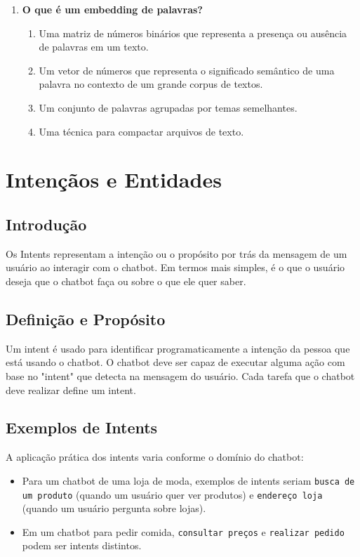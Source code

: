 \documentclass[14pt,a4paper,oneside]{book}
\begin{document}
\begin{enumerate}
\item \textbf{O que é um embedding de palavras?} 
\begin{enumerate}[label=\alph*)]
\item Uma matriz de números binários que representa a presença ou ausência de palavras em um texto. 
\item Um vetor de números que representa o significado semântico de uma palavra no contexto de um grande corpus de textos. 
\item Um conjunto de palavras agrupadas por temas semelhantes. 
\item Uma técnica para compactar arquivos de texto. 
\end{enumerate}

\end{enumerate}


\chapter{Intençãos e Entidades}
\label{chap:intents}

\section{Introdução}

Os Intents representam a intenção ou o propósito por trás da mensagem de um usuário ao interagir com o chatbot. Em termos mais simples, é o que o usuário deseja que o chatbot faça ou sobre o que ele quer saber.

\section{Definição e Propósito}
\label{sec:intents_definicao}

Um intent é usado para identificar programaticamente a intenção da pessoa que está usando o chatbot. O chatbot deve ser capaz de executar alguma ação com base no "intent" que detecta na mensagem do usuário. Cada tarefa que o chatbot deve realizar define um intent.

\section{Exemplos de Intents}
\label{sec:intents_exemplos}

A aplicação prática dos intents varia conforme o domínio do chatbot:
\begin{itemize}
    \item Para um chatbot de uma loja de moda, exemplos de intents seriam \texttt{busca de um produto} (quando um usuário quer ver produtos) e \texttt{endereço loja} (quando um usuário pergunta sobre lojas).
    \item Em um chatbot para pedir comida, \texttt{consultar preços} e \texttt{realizar pedido} podem ser intents distintos.
\end{itemize}
\end{document}
